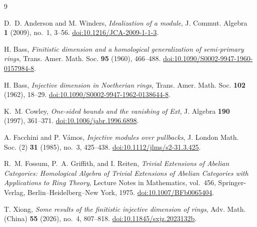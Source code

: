 \documentclass[11pt]{amsart}
\theoremstyle{definition}
\numberwithin{equation}{section}
\begin{document}
\begin{thebibliography}{9}

D.~D. Anderson and M. Winders,
\emph{Idealization of a module},
J. Commut. Algebra \textbf{1} (2009), no.~1, 3--56.
\href{https://doi.org/10.1216/JCA-2009-1-1-3}{doi:10.1216/JCA-2009-1-1-3}.

H. Bass,
\emph{Finitistic dimension and a homological generalization of semi-primary rings},
Trans. Amer. Math. Soc. \textbf{95} (1960), 466--488.
\href{https://doi.org/10.1090/S0002-9947-1960-0157984-8}{doi:10.1090/S0002-9947-1960-0157984-8}.

H. Bass,
\emph{Injective dimension in Noetherian rings},
Trans. Amer. Math. Soc. \textbf{102} (1962), 18--29.
\href{https://doi.org/10.1090/S0002-9947-1962-0138644-8}
{doi:10.1090/S0002-9947-1962-0138644-8}.

K.~M. Cowley,
\emph{One-sided bounds and the vanishing of Ext},
J. Algebra \textbf{190} (1997), 361--371.
\href{https://doi.org/10.1006/jabr.1996.6898}{doi:10.1006/jabr.1996.6898}.

A. Facchini and P. V\'amos,
\emph{Injective modules over pullbacks},
J. London Math. Soc. (2) \textbf{31} (1985), no.~3, 425--438.
\href{https://doi.org/10.1112/jlms/s2-31.3.425}{doi:10.1112/jlms/s2-31.3.425}.

R.~M. Fossum, P.~A. Griffith, and I. Reiten,
\emph{Trivial Extensions of Abelian Categories: Homological Algebra of
Trivial Extensions of Abelian Categories with Applications to Ring Theory},
Lecture Notes in Mathematics, vol.~456, Springer-Verlag,
Berlin--Heidelberg--New York, 1975.
\href{https://doi.org/10.1007/BFb0065404}{doi:10.1007/BFb0065404}.

T. Xiong,
\emph{Some results of the finitistic injective dimension of rings},
Adv. Math. (China) \textbf{55} (2026), no.~4, 807--818.
\href{https://doi.org/10.11845/sxjz.2023132b}{doi:10.11845/sxjz.2023132b}.

\end{thebibliography}
\end{document}

